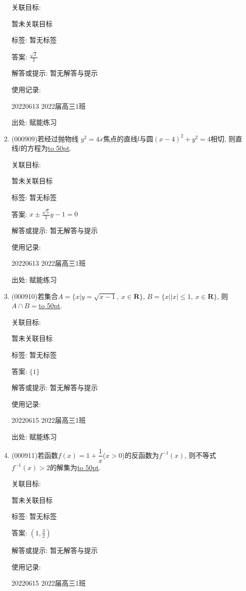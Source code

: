 \documentclass[10pt,a4paper]{article}
\newcommand{\blank}[1]{\underline{\hbox to #1pt{}}}
\begin{document}
\begin{enumerate}[1.]
关联目标:

暂未关联目标



标签: 暂无标签

答案: $\frac{\sqrt 2}2$

解答或提示: 暂无解答与提示

使用记录:

20220613	2022届高三1班	


出处: 赋能练习
\item { (000909)}若经过抛物线 $y^2=4x$焦点的直线$l$与圆$(x-4)^2+y^2=4$相切, 则直线$l$的方程为\blank{50}.


关联目标:

暂未关联目标



标签: 暂无标签

答案: $x\pm \frac{\sqrt 5}2y-1=0$

解答或提示: 暂无解答与提示

使用记录:

20220613	2022届高三1班	


出处: 赋能练习
\item { (000910)}若集合$A=\{x|y=\sqrt{x-1},\ x\in \mathbf{R}\}$, $B=\{x||x|\le 1,\ x\in \mathbf{R}\}$, 则$A\cap B=$\blank{50}.


关联目标:

暂未关联目标



标签: 暂无标签

答案: $\{1\}$

解答或提示: 暂无解答与提示

使用记录:

20220615	2022届高三1班	


出处: 赋能练习
\item { (000911)}若函数$f(x)=1+\dfrac1x$($x>0$)的反函数为$f^{-1}(x)$, 则不等式$f^{-1}(x)>2$的解集为\blank{50}.


关联目标:

暂未关联目标



标签: 暂无标签

答案: $(1,\frac 32)$

解答或提示: 暂无解答与提示

使用记录:

20220615	2022届高三1班	



\end{enumerate}
\end{document}
